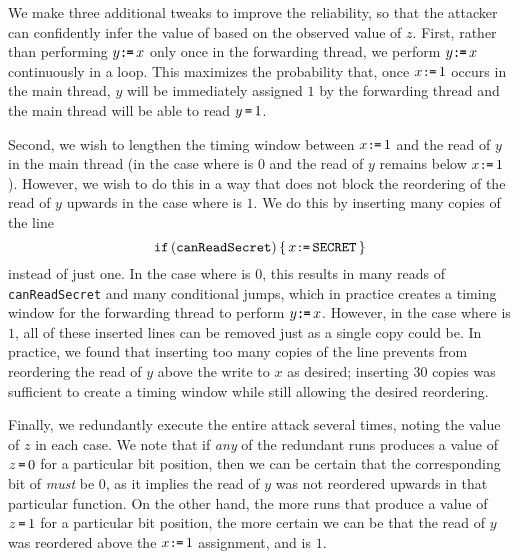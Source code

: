 \documentclass[conference]{IEEEtran}
\theoremstyle{plain}
\theoremstyle{definition}
\begin{document}
We make three additional tweaks to improve the reliability, so that the attacker
can confidently infer the value of {\SEC} based on the observed value of $z$.
  First, rather than performing $y\texttt{:}\mkern-1mu\texttt{=}\, x$ only once in the forwarding thread,
we perform $y\texttt{:}\mkern-1mu\texttt{=}\, x$ continuously in a loop.
This maximizes the probability that, once $x\texttt{:}\mkern-1mu\texttt{=}\, 1$ occurs in the main
thread, $y$ will be immediately assigned $1$ by the forwarding thread
and the main thread will be able to read $y\,\texttt{=}\, 1$.

Second, we wish to lengthen the timing window between $x\texttt{:}\mkern-1mu\texttt{=}\, 1$ and the
read of $y$ in the main thread (in the case where
{\SEC} is $0$ and the read of $y$ remains below $x\texttt{:}\mkern-1mu\texttt{=}\, 1$).
However, we wish to do this in a way that does not block the reordering of the
read of $y$ upwards in the case where {\SEC} is $1$.
We do this by inserting many copies of the line
\[
  \texttt{if}\, (\texttt{canReadSecret}) \,\{\, x\texttt{:}\mkern-1mu\texttt{=}\,\texttt{SECRET}\,\}
\]
instead of just one.
In the case where {\SEC} is $0$, this
results in many reads of \verb|canReadSecret| and many conditional jumps,
which in practice creates a timing window for the forwarding thread to perform
$y\texttt{:}\mkern-1mu\texttt{=}\, x$.
However, in the case where {\SEC} is $1$,
all of these inserted lines can be removed just as a single copy could be.
In practice, we found that inserting too many copies of the line prevents
{\GCC} from reordering the read of $y$ above the write to $x$ as
desired; inserting $30$ copies was sufficient to create a timing window
while still allowing the desired reordering.

Finally, we redundantly execute the entire attack several times, noting the
value of $z$ in each case.
We note that if \emph{any} of the redundant runs produces a value of
$z\,\texttt{=}\,0$ for a particular bit position, then we can be certain that the
corresponding bit of {\SEC} \emph{must} be $0$, as it implies the
read of $y$ was not reordered upwards in that particular function.
On the other hand, the more runs that produce a value of $z\,\texttt{=}\,1$ for a
particular bit position, the more certain we can be that the read of $y$
was reordered above the $x\texttt{:}\mkern-1mu\texttt{=}\, 1$ assignment, and {\SEC} is $1$.
\end{document}
